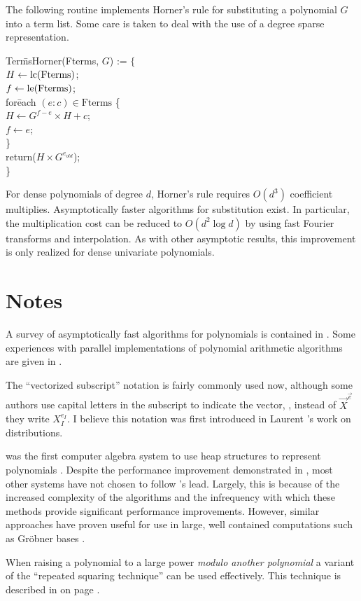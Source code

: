 The following routine implements Horner's rule for substituting a
polynomial $G$ into a term list.  Some care is taken to deal with the
use of a degree sparse representation. 

\begindsacode
Ter\=msHorner(Fterms, $G$) := $\{$ \\
\> $H \leftarrow \operatorname{lc}(\mbox{Fterms})$; \\
\> $f \leftarrow \operatorname{le}(\mbox{Fterms})$; \\
\> for\=each $(e : c) \in \mbox{Fterms}$ \{ \\
\>\> $H \leftarrow G^{f - e} \times H + c$; \\
\>\> $f \leftarrow e$; \\
\>\> \} \\
\> return($H \times G^{e_{old}}$); \\
\> \}
\enddsacode

For dense polynomials of degree $d$, Horner's rule requires $O(d^3)$
coefficient multiplies.  Asymptotically faster algorithms for
substitution exist.  In particular, the multiplication cost can be
reduced to $O(d^2 \log d)$ by using fast Fourier transforms and
interpolation.  As with other asymptotic results, this improvement is
only realized for dense univariate polynomials.

\section*{Notes}

\small

A survey of asymptotically fast algorithms for polynomials is
contained in \cite{Pan92b}.  Some experiences with parallel
implementations of polynomial arithmetic algorithms are given in
\cite{Ponder91, SilvermanRD90}. 

 The ``vectorized subscript''
notation is fairly commonly used now, although some authors use
capital letters in the subscript to indicate the vector, \ie, instead
of $\vec{X}^{\vec{e}}$ they write $X_I^{e_I}$.  I believe this
notation was first introduced in Laurent {\SchwartzL}'s work on
distributions.

 {\Altran} was the first computer algebra
system to use heap structures to represent polynomials
\cite{Brown:ALTRAN}.  Despite the performance improvement demonstrated
in {\Altran} \cite{Y2n:Problem}, most other systems have not chosen to
follow {\Altran}'s lead.  Largely, this is because of the increased
complexity of the algorithms and the infrequency with which these
methods provide significant performance improvements.  However,
similar approaches have proven useful for use in large, well contained
computations such as Gr\"{o}bner bases \cite{TYan}.

 When raising a polynomial to a large
power {\em modulo another polynomial} a variant of the ``repeated
squaring technique'' can be used effectively.  This technique is
described in  on page
\pageref{FFac:Distinct:Sec}.

\normalsize


